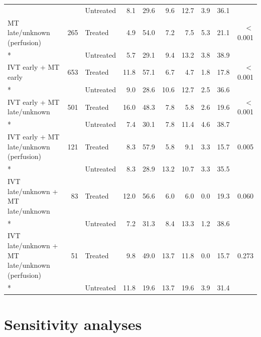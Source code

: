 \begin{landscape}
\begin{longtable}{p{5.6cm}rlrrrrrrr}
 & & Untreated & 8.1 & 29.6 & 9.6 & 12.7 & 3.9 & 36.1 & \\[2pt]
MT late/unknown (perfusion) & 265 & Treated & 4.9 & 54.0 & 7.2 & 7.5 & 5.3 & 21.1 & $<$0.001 \\*
 & & Untreated & 5.7 & 29.1 & 9.4 & 13.2 & 3.8 & 38.9 & \\[2pt]
IVT early + MT early & 653 & Treated & 11.8 & 57.1 & 6.7 & 4.7 & 1.8 & 17.8 & $<$0.001 \\*
 & & Untreated & 9.0 & 28.6 & 10.6 & 12.7 & 2.5 & 36.6 & \\[2pt]
IVT early + MT late/unknown & 501 & Treated & 16.0 & 48.3 & 7.8 & 5.8 & 2.6 & 19.6 & $<$0.001 \\*
 & & Untreated & 7.4 & 30.1 & 7.8 & 11.4 & 4.6 & 38.7 & \\[2pt]
IVT early + MT late/unknown (perfusion) & 121 & Treated & 8.3 & 57.9 & 5.8 & 9.1 & 3.3 & 15.7 & 0.005 \\*
 & & Untreated & 8.3 & 28.9 & 13.2 & 10.7 & 3.3 & 35.5 & \\[2pt]
IVT late/unknown + MT late/unknown & 83 & Treated & 12.0 & 56.6 & 6.0 & 6.0 & 0.0 & 19.3 & 0.060 \\*
 & & Untreated & 7.2 & 31.3 & 8.4 & 13.3 & 1.2 & 38.6 & \\[2pt]
IVT late/unknown + MT late/unknown (perfusion) & 51 & Treated & 9.8 & 49.0 & 13.7 & 11.8 & 0.0 & 15.7 & 0.273 \\*
 & & Untreated & 11.8 & 19.6 & 13.7 & 19.6 & 3.9 & 31.4 & \\[2pt]
\end{longtable}
\vspace{-0.5\baselineskip}
\end{landscape}


\clearpage

\section{Sensitivity analyses}\label{sec:supp_sensitivity}

